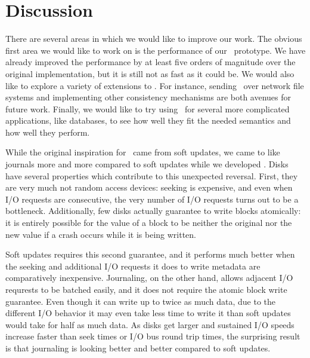\section {Discussion}
\label{sec:discussion}

There are several areas in which we would like to improve our work. The obvious
first area we would like to work on is the performance of our \Kudos\ prototype.
%
We have already improved the performance by at least five orders of magnitude
over the original implementation, but it is still not as fast as it could be.
%
We would also like to explore a variety of extensions to \Kudos. For instance,
sending \patches\ over network file systems and implementing other consistency
mechanisms are both avenues for future work.
%
Finally, we would like to try using \patchgroups\ for several more complicated
applications, like databases, to see how well they fit the needed semantics and
how well they perform.


While the original inspiration for \patches\ came from soft updates, we came to
like journals more and more compared to soft updates while we developed \Kudos.
%
Disks have several properties which contribute to this unexpected reversal.
First, they are very much not random access devices: seeking is expensive, and
even when I/O requests are consecutive, the very number of I/O requests turns
out to be a bottleneck.
%
Additionally, few disks actually guarantee to write blocks atomically: it is
entirely possible for the value of a block to be neither the original nor the
new value if a crash occurs while it is being written.


Soft updates requires this second guarantee, and it performs much better when
the seeking and additional I/O requests it does to write metadata are
comparatively inexpensive.
%
Journaling, on the other hand, allows adjacent I/O requrests to be batched
easily, and it does not require the atomic block write guarantee.
%
Even though it can write up to twice as much data, due to the different I/O
behavior it may even take less time to write it than soft updates would take for
half as much data.
%
As disks get larger and sustained I/O speeds increase faster than seek times or
I/O bus round trip times, the surprising result is that journaling is looking
better and better compared to soft updates.
